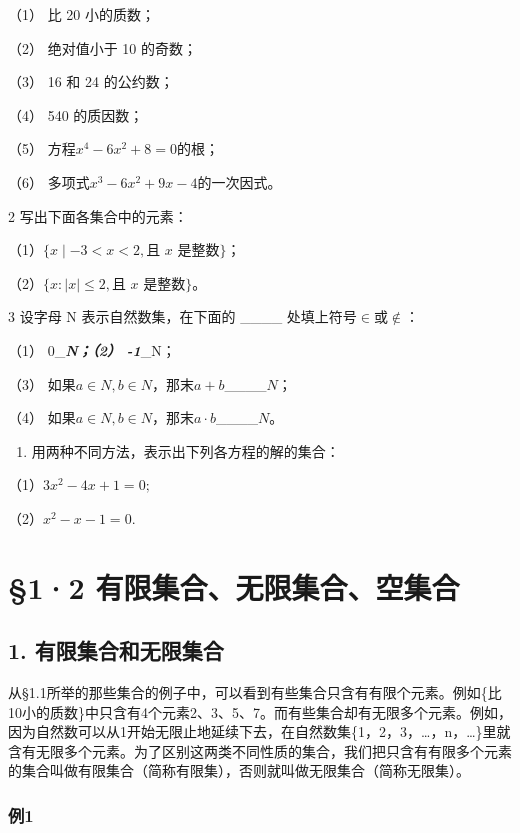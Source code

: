 （1） 比 20 小的质数；

（2） 绝对值小于 10 的奇数；

（3） 16 和 24 的公约数；

（4） 540 的质因数；

（5） 方程\(x^{4}-6x^{2}+8=0\)的根；

（6） 多项式\(x^{3}-6x^{2}+9x-4\)的一次因式。

2 写出下面各集合中的元素：

（1）\(\{x \mid -3 < x < 2, \text{且 } x \text{ 是整数}\}\)；

（2）\(\{x: |x| \leqslant 2, \text{且 } x \text{ 是整数}\}\)。

3 设字母 N 表示自然数集，在下面的 \_\_\_\_
处填上符号\(\in\)或\(\notin\)：

（1） 0\_\textbf{\emph{N；（2） -1}}\_N；

（3） 如果\(a \in N, b \in N\)，那末\(a + b\)\_\_\_\_\(N\)；

（4） 如果\(a \in N, b \in N\)，那末\(a \cdot b\)\_\_\_\_\(N\)。

\begin{enumerate}[start=4]
\item
  用两种不同方法，表示出下列各方程的解的集合：
\end{enumerate}

（1）\(3x^{2} - 4x + 1 = 0;\)

（2）\(x^{2} - x - 1 = 0.\)

\section{§1·2 有限集合、无限集合、空集合}

\subsection{1. 有限集合和无限集合}

从§1.1所举的那些集合的例子中，可以看到有些集合只含有有限个元素。例如\{比10小的质数\}中只含有4个元素2、3、5、7。而有些集合却有无限多个元素。例如，因为自然数可以从1开始无限止地延续下去，在自然数集\{1，2，3，\ldots，n，\ldots\}里就含有无限多个元素。为了区别这两类不同性质的集合，我们把只含有有限多个元素的集合叫做有限集合（简称有限集），否则就叫做无限集合（简称无限集）。

\subsubsection{例1}

